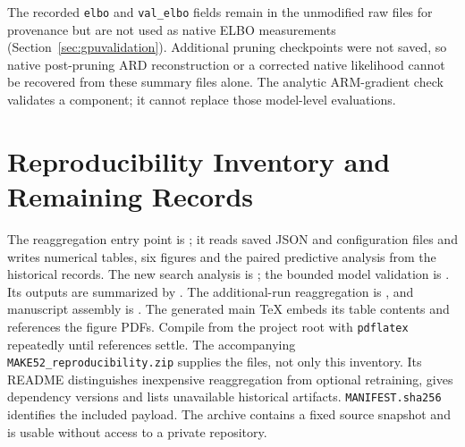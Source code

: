 \documentclass[make,article,submit,pdftex,moreauthors]{Definitions/mdpi}
\begin{document}
The recorded \texttt{elbo} and \texttt{val\_elbo} fields remain in the
unmodified raw files for provenance but are not used as native ELBO
measurements (Section~\ref{sec:gpuvalidation}). Additional pruning
checkpoints were not saved, so native post-pruning ARD reconstruction
or a corrected native likelihood cannot be recovered from these
summary files alone. The analytic ARM-gradient check validates a
component; it cannot replace those model-level evaluations.


\section{Reproducibility Inventory and Remaining Records}\label{app:inventory}
The reaggregation entry point is
; it reads saved JSON and configuration
files and writes numerical tables, six figures and the paired predictive
analysis from the historical records. The new search analysis is
; the bounded model validation is
. Its outputs are summarized by
. The additional-run reaggregation is
, and manuscript assembly is
. The generated main TeX embeds its
table contents and references the figure PDFs. Compile from the project
root with \texttt{pdflatex} repeatedly until references settle.
The accompanying \texttt{MAKE52\_reproducibility.zip} supplies the files,
not only this inventory. Its README distinguishes inexpensive
reaggregation from optional retraining, gives dependency versions and
lists unavailable historical artifacts. \texttt{MANIFEST.sha256}
identifies the included payload. The archive contains a fixed source
snapshot and is usable without access to a private repository.
\end{document}
